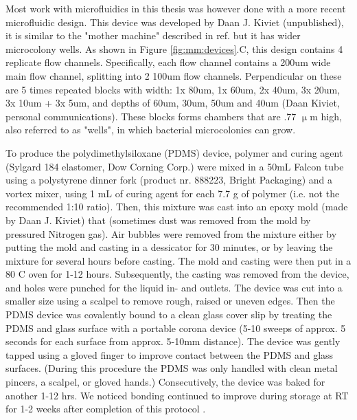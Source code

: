 Most work with microfluidics in this thesis was however done with a more recent microfluidic design.
This device was developed by Daan J. Kiviet (unpublished), it is similar to the "mother machine" described in ref. \cite{Taheri-Araghi2014} but it has wider microcolony wells. As shown in Figure \ref{fig:mm:devices}.C, this design contains 4 replicate flow channels.
Specifically, each flow channel contains a 200um wide main flow channel, splitting into 2 100um flow channels. 
Perpendicular on these are 5 times repeated blocks with width: 1x 80um, 1x 60um, 2x 40um, 3x 20um, 3x 10um + 3x 5um, and depths of 60um, 30um, 50um and 40um (Daan Kiviet, personal communications).
These blocks forms chambers that are .77 $\upmu$m high, also referred to as "wells", in which bacterial microcolonies can grow.


To produce the polydimethylsiloxane (PDMS) device, polymer and curing agent (Sylgard 184 elastomer, Dow Corning Corp.) were mixed in a 50mL Falcon tube using a polystyrene dinner fork (product nr. 888223, Bright Packaging) and a vortex mixer, using 1 mL of curing agent for each 7.7 g of polymer (i.e. not the recommended 1:10 ratio).
Then, this mixture was cast into an epoxy mold  (made by Daan J. Kiviet) that  (sometimes dust was removed from the mold by pressured Nitrogen gas).
Air bubbles were removed from the mixture either by putting the mold and casting in a dessicator for 30 minutes, or by leaving the mixture for several hours before casting.
The mold and casting were then put in a 80 C oven for 1-12 hours. 
Subsequently, the casting was removed from the device, and holes were punched for the liquid in- and outlets.
The device was cut into a smaller size using a scalpel to remove rough, raised or uneven edges.
Then the PDMS device was covalently bound to a clean glass cover slip by treating the PDMS and glass surface with a portable corona device \cite{Haubert2006} (5-10 sweeps of approx. 5 seconds for each surface from approx. 5-10mm distance).
The device was gently tapped using a gloved finger to improve contact between the PDMS and glass surfaces.
(During this procedure the PDMS was only handled with clean metal pincers, a scalpel, or gloved hands.)
Consecutively, the device was baked for another 1-12 hrs. We noticed bonding continued to improve during storage at RT for 1-2 weeks after completion of this protocol .



